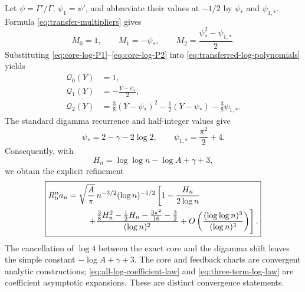 Let $\psi=\Gamma'/\Gamma$, $\psi_1=\psi'$, and abbreviate their
values at $-1/2$ by $\psi_*$ and $\psi_{1,*}$.  Formula
\eqref{eq:transfer-multipliers} gives
\[
 M_0=1,\qquad M_1=-\psi_*,\qquad
 M_2=\frac{\psi_*^2-\psi_{1,*}}2.
\]
Substituting \eqref{eq:core-log-P1}--\eqref{eq:core-log-P2} into
\eqref{eq:transferred-log-polynomials} yields
\begin{align*}
 \mathcal Q_0(Y)&=1,\\
 \mathcal Q_1(Y)&=-\frac{Y-\psi_*}{2},\\
 \mathcal Q_2(Y)&=\frac38(Y-\psi_*)^2-\frac12(Y-\psi_*)
                  -\frac38\psi_{1,*}.
\end{align*}
The standard digamma recurrence and half-integer values give
\[
 \psi_*=2-\gamma-2\log2,\qquad
 \psi_{1,*}=\frac{\pi^2}{2}+4.
\]
Consequently, with
\begin{equation}\label{eq:log-Hn}
 H_n=\log\log n-\log A+\gamma+3,
\end{equation}
we obtain the explicit refinement
\begin{equation}\label{eq:three-term-log-law}
 \boxed{\begin{aligned}
 R_{\mathrm b}^n a_n={}&\sqrt{\frac A\pi}\,
 n^{-3/2}(\log n)^{-1/2}\left[
 1-\frac{H_n}{2\log n}\right.\\
 &\left.\quad+
 \frac{\frac38H_n^2-\frac12H_n-\frac{3\pi^2}{16}-\frac32}
 {(\log n)^2}
 +O\left(\frac{(\log\log n)^3}{(\log n)^3}\right)
 \right].
 \end{aligned}}
\end{equation}
The cancellation of $\log4$ between the exact core and the digamma
shift leaves the simple constant $-\log A+\gamma+3$.
The core and feedback charts are convergent analytic constructions;
\eqref{eq:all-log-coefficient-law} and
\eqref{eq:three-term-log-law} are coefficient asymptotic expansions.
These are distinct convergence statements.
